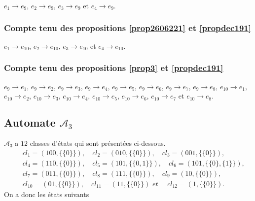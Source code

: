 $e_{1}\rightarrow e_{9}$, $e_{2}\rightarrow e_{9}$, $e_{3}\rightarrow e_{9}$ et $e_{4}\rightarrow e_{9}$.
\begin{spacing}{0.30}
\subsubsection*{Compte tenu des propositions \ref{prop2606221} et \ref{propdec191}}
\end{spacing}
$e_{1}\rightarrow e_{10}$, $e_{2}\rightarrow e_{10}$, $e_{3}\rightarrow e_{10}$ et $e_{4}\rightarrow e_{10}$.
\begin{spacing}{0.30}
\subsubsection*{Compte tenu des propositions \ref{prop3} et \ref{propdec191}}
\end{spacing}
$e_{9}\rightarrow e_{1}$, $e_{9}\rightarrow e_{2}$, $e_{9}\rightarrow e_{3}$, $e_{9}\rightarrow e_{4}$,   $e_{9}\rightarrow e_{5}$, $e_{9}\rightarrow e_{6}$, $e_{9}\rightarrow e_{7}$, $e_{9}\rightarrow e_{8}$, $e_{10}\rightarrow e_{1}$, $e_{10}\rightarrow e_{2}$, $e_{10}\rightarrow e_{3}$, $e_{10}\rightarrow e_{4}$, $e_{10}\rightarrow e_{5}$, $e_{10}\rightarrow e_{6}$, $e_{10}\rightarrow e_{7}$ et $e_{10}\rightarrow e_{8}$.
\begin{spacing}{0.30}
\section{Automate $\mathcal{A}_{3}$}
\end{spacing}
$\mathcal{A}_{3}$ a $12$ classes d'états qui sont présentées ci-dessous.
\begin{eqnarray*}
& & cl_{1} = (100,\{\{0\}\}), \quad cl_{2} = (010,\{\{0\}\}), \quad cl_{3}=(001,\{\{0\}\}),\\
& &cl_{4}=(110,\{\{0\}\}),\quad cl_{5}=(101,\{\{0,1\}\}),\quad cl_{6} = (101,\{\{0\},\{1\}\}), \\
& &cl_{7} = (011,\{\{0\}\}),\quad cl_{8}=(111,\{\{0\}\}),\quad cl_{9}=(10,\{\{0\}\}),\\
& & cl_{10}=(01,\{\{0\}\}),\quad cl_{11} =(11,\{\{0\}\})\textit{ et }\quad cl_{12}=(1,\{\{0\}\}).
\end{eqnarray*} 
On a donc les états suivants
\small
